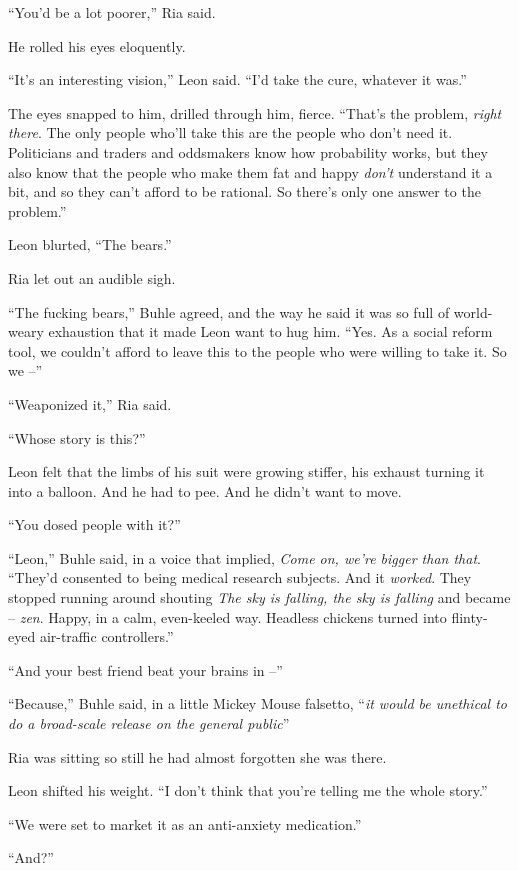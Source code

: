 “You'd be a lot poorer,” Ria said.

He rolled his eyes eloquently.

“It's an interesting vision,” Leon said. “I'd take the cure, 
whatever it was.”

The eyes snapped to him, drilled through him, fierce. “That's the 
problem, \emph{right there}. The only people who'll take this are the 
people who don't need it. Politicians and traders and oddsmakers know 
how probability works, but they also know that the people who make them 
fat and happy \emph{don't} understand it a bit, and so they can't 
afford to be rational. So there's only one answer to the problem.”

Leon blurted, “The bears.”

Ria let out an audible sigh.

“The fucking bears,” Buhle agreed, and the way he said it was so 
full of world-weary exhaustion that it made Leon want to hug him. 
“Yes. As a social reform tool, we couldn't afford to leave this to 
the people who were willing to take it. So we --”

“Weaponized it,” Ria said.

“Whose story is this?”

Leon felt that the limbs of his suit were growing stiffer, his exhaust 
turning it into a balloon. And he had to pee. And he didn't want to 
move.

“You dosed people with it?”

“Leon,” Buhle said, in a voice that implied, \emph{Come on, we're 
bigger than that}. “They'd consented to being medical research 
subjects. And it \emph{worked}. They stopped running around shouting 
\emph{The sky is falling, the sky is falling} and became -- \emph{zen}. 
Happy, in a calm, even-keeled way. Headless chickens turned into 
flinty-eyed air-traffic controllers.”

“And your best friend beat your brains in --”

“Because,” Buhle said, in a little Mickey Mouse falsetto, 
“\emph{it would be unethical to do a broad-scale release on the 
general public}”

Ria was sitting so still he had almost forgotten she was there.

Leon shifted his weight. “I don't think that you're telling me the 
whole story.”

“We were set to market it as an anti-anxiety medication.”

“And?”

